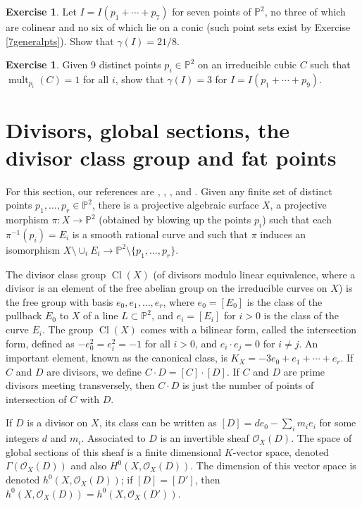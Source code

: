 \documentclass[11pt,twoside]{amsart}
\numberwithin{equation}{section}
\newcounter{xrcs}[section]
\theoremstyle{definition}
\newtheorem{exercise}[xrcs]{Exercise}
\begin{document}
\begin{exercise}\label{gammafor7pts}
Let $I=I(p_1+\cdots+p_7)$ for seven points of ${\mathbb{P}^{2}}$, no three of which are colinear and no six of which
lie on a conic (such point sets exist by Exercise \ref{7generalpts}). Show that $\gamma(I)=21/8$. 
\end{exercise}

\begin{exercise}\label{9generalpts}
Given 9 distinct points $p_i\in{\mathbb{P}^{2}}$ on an irreducible cubic $C$ such that ${\operatorname{mult}}_{p_i}(C)=1$
for all $i$, show that $\gamma(I)=3$ for $I=I(p_1+\cdots+p_9)$. 
\end{exercise}

\section{Divisors, global sections, the divisor class group and fat points}\label{Weyl}

For this section, our references are \cite{refHr}, \cite{refN2}, \cite{refdv},
\cite{refKrakow} and \cite{refDuke}.
Given any finite set of distinct points $p_1,\ldots,p_r\in{\mathbb{P}^{2}}$, there is a projective algebraic surface
$X$, a projective morphism $\pi:X\to{\mathbb{P}^{2}}$ (obtained by blowing up the points $p_i$)
such that each $\pi^{-1}(p_i)=E_i$ is a smooth rational curve
and such that $\pi$ induces an isomorphism $X\setminus\cup_iE_i\to {\mathbb{P}^{2}}\setminus\{p_1,\ldots,p_r\}$.

The divisor class group $\operatorname{Cl}(X)$ (of divisors modulo linear equivalence, where a divisor
is an element of the free abelian group on the irreducible curves on $X$) is the free group with basis
$e_0,e_1,\ldots,e_r$, where $e_0=[E_0]$ is the class of the pullback $E_0$ to $X$ of a line $L\subset{\mathbb{P}^{2}}$,
and $e_i=[E_i]$ for $i>0$ is the class of the curve $E_i$. The group $\operatorname{Cl}(X)$ comes
with a bilinear form, called the intersection form, defined as $-e_0^2=e_i^2=-1$ for all $i>0$, and 
$e_i\cdot e_j=0$ for $i\neq j$. An important element, known as the canonical class,
is $K_X=-3e_0+e_1+\cdots+e_r$. If $C$ and $D$ are divisors, we define $C\cdot D=[C]\cdot [D]$.
If $C$ and $D$ are prime divisors meeting transversely, then $C\cdot D$ is just the number of points of intersection
of $C$ with $D$.

If $D$ is a divisor on $X$, its class can be written as $[D]=de_0-\sum_im_ie_i$ for some integers $d$ and $m_i$.
Associated to $D$ is an invertible sheaf ${{\mathcal O}}_X(D)$. The space of global sections of this sheaf 
is a finite dimensional ${K}$-vector space, denoted $\Gamma({{\mathcal O}}_X(D))$ and also $H^0(X,{{\mathcal O}}_X(D))$.
The dimension of this vector space is denoted $h^0(X,{{\mathcal O}}_X(D))$; if $[D]=[D']$, then
$h^0(X,{{\mathcal O}}_X(D))=h^0(X,{{\mathcal O}}_X(D'))$.
\end{document}
